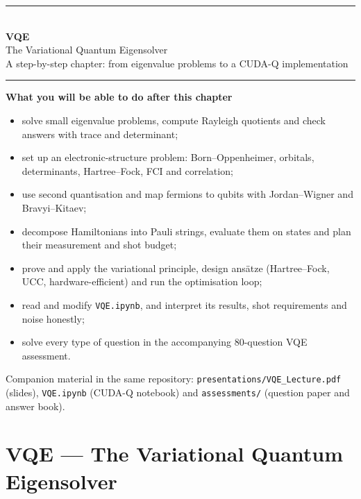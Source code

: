 \documentclass[11pt,a4paper,openany]{book}
\begin{document}
\begin{titlepage}
\centering
{\color{brand}\rule{\linewidth}{1.5pt}}\\[10pt]
{\Huge\bfseries\color{brand} VQE}\\[8pt]
{\LARGE The Variational Quantum Eigensolver}\\[6pt]
{\large A step-by-step chapter: from eigenvalue problems to a CUDA-Q implementation}\\[6pt]
{\color{brand}\rule{\linewidth}{1.5pt}}
\vspace{18mm}

\begin{minipage}{0.86\linewidth}
\large
\textbf{What you will be able to do after this chapter}
\begin{itemize}[itemsep=3pt]
\item solve small eigenvalue problems, compute Rayleigh quotients and check answers with trace and determinant;
\item set up an electronic-structure problem: Born--Oppenheimer, orbitals, determinants, Hartree--Fock, FCI and correlation;
\item use second quantisation and map fermions to qubits with Jordan--Wigner and Bravyi--Kitaev;
\item decompose Hamiltonians into Pauli strings, evaluate them on states and plan their measurement and shot budget;
\item prove and apply the variational principle, design ansätze (Hartree--Fock, UCC, hardware-efficient) and run the optimisation loop;
\item read and modify \texttt{VQE.ipynb}, and interpret its results, shot requirements and noise honestly;
\item solve every type of question in the accompanying 80-question VQE assessment.
\end{itemize}
\end{minipage}
\vfill
{\small Companion material in the same repository: \texttt{presentations/VQE\_Lecture.pdf} (slides),
\texttt{VQE.ipynb} (CUDA-Q notebook) and \texttt{assessments/} (question paper and answer book).}
\end{titlepage}

\tableofcontents
\setcounter{chapter}{0}
\chapter*{VQE --- The Variational Quantum Eigensolver}
\end{document}
